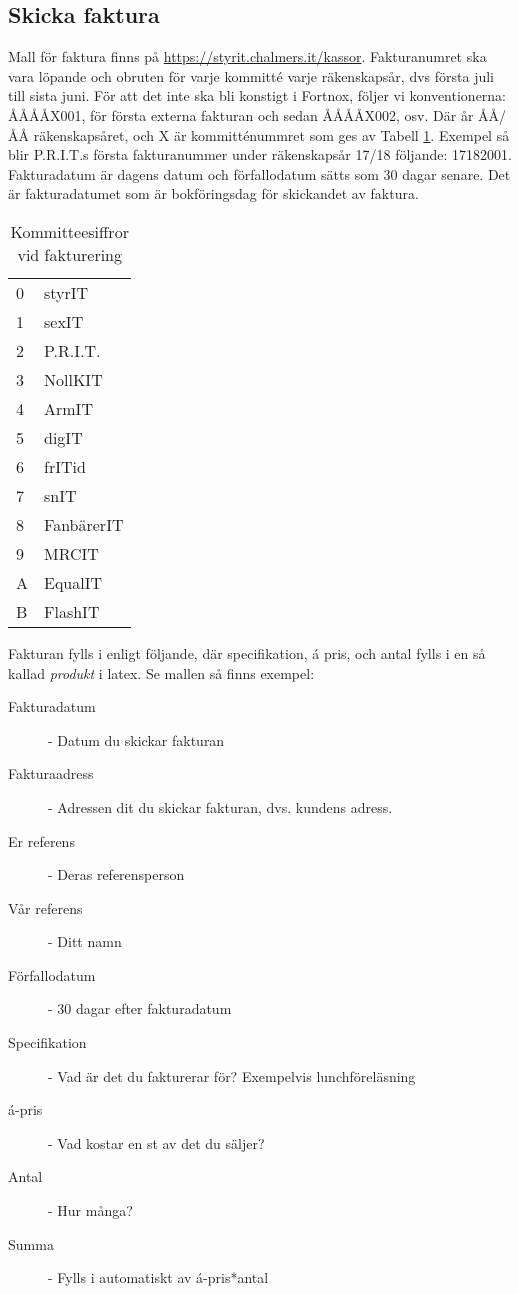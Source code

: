 \documentclass{article}
\begin{document}
\subsection{Skicka faktura}
Mall för faktura finns på \url{https://styrit.chalmers.it/kassor}. Fakturanumret ska vara löpande och obruten för varje kommitté varje räkenskapsår, dvs första juli till sista juni. För att det inte ska bli konstigt i Fortnox, följer vi konventionerna: ÅÅÅÅX001, för första externa fakturan och sedan ÅÅÅÅX002, osv. Där år ÅÅ/ÅÅ räkenskapsåret, och X är kommitténummret som ges av Tabell \ref{committee-numbers}. Exempel så blir P.R.I.T.s första fakturanummer under räkenskapsår 17/18 följande: 17182001. Fakturadatum är dagens datum och förfallodatum sätts som 30 dagar senare. Det är fakturadatumet som är bokföringsdag för skickandet av faktura.  
\begin{table}[h]
\centering
\caption{Kommitteesiffror vid fakturering}
\label{committee-numbers}
\begin{tabular}{ll}
0 & styrIT     \\
1 & sexIT      \\
2 & P.R.I.T.   \\
3 & NollKIT    \\
4 & ArmIT      \\
5 & digIT      \\
6 & frITid     \\
7 & snIT       \\
8 & FanbärerIT \\
9 & MRCIT \\
A & EqualIT \\
B & FlashIT \\
\end{tabular}
\end{table}
Fakturan fylls i enligt följande, där specifikation, á pris, och antal fylls i en så kallad \textit{produkt} i latex. Se mallen så finns exempel: 
\begin{description}
    \item[Fakturadatum] - Datum du skickar fakturan
    \item[Fakturaadress] - Adressen dit du skickar fakturan, dvs. kundens adress.
    \item[Er referens] - Deras referensperson
    \item[Vår referens] - Ditt namn
    \item[Förfallodatum] - 30 dagar efter fakturadatum
    \item[Specifikation] - Vad är det du fakturerar för? Exempelvis lunchföreläsning
    \item[á-pris] - Vad kostar en st av det du säljer?
    \item[Antal] - Hur många?
    \item[Summa] - Fylls i automatiskt av á-pris*antal
\end{description}
\end{document}
